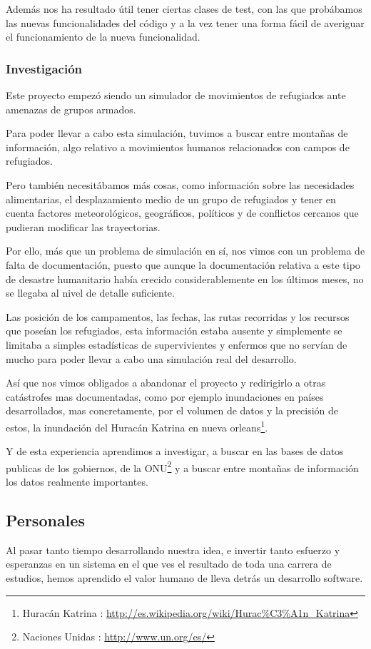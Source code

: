 Además nos ha resultado útil tener ciertas clases de test, con las que
probábamos las nuevas funcionalidades del código y a la vez tener una forma
fácil de averiguar el funcionamiento de la nueva funcionalidad.
\subsubsection*{Investigación}
Este proyecto empezó siendo un simulador de movimientos de refugiados ante
amenazas de grupos armados.

Para poder llevar a cabo esta simulación, tuvimos a buscar entre
montañas de información, algo relativo a movimientos humanos relacionados con
campos de refugiados.

Pero también necesitábamos más cosas, como información sobre las necesidades
alimentarias, el desplazamiento medio de un grupo de refugiados y tener en
cuenta factores meteorológicos, geográficos, políticos y de conflictos cercanos
que pudieran modificar las trayectorias.

Por ello, más que un problema de simulación en sí, nos vimos con un problema de
falta de documentación, puesto que aunque la documentación relativa a este tipo
de desastre humanitario había crecido considerablemente en los últimos meses,
no se llegaba al nivel de detalle  suficiente.

Las posición de los campamentos, las fechas, las rutas recorridas y los recursos
que poseían los refugiados, esta información estaba ausente y simplemente
se limitaba a simples estadísticas de
supervivientes y enfermos que no servían de mucho para poder llevar a cabo una
simulación real del desarrollo.

Así que nos vimos obligados a abandonar el proyecto y redirigirlo a otras
catástrofes mas documentadas, como por ejemplo inundaciones en países
desarrollados, mas concretamente, por el volumen de datos y la precisión de
estos, la inundación del Huracán Katrina en nueva orleans\footnote{Huracán
Katrina : \url{http://es.wikipedia.org/wiki/Hurac\%C3\%A1n_Katrina}}.

Y de esta experiencia aprendimos a investigar, a buscar en las bases de datos
publicas de los gobiernos, de la ONU\footnote{Naciones Unidas :
\url{http://www.un.org/es/}} y a buscar entre montañas de información
los datos realmente importantes.
\subsection*{Personales}
Al pasar tanto tiempo desarrollando nuestra idea, e invertir tanto esfuerzo y
esperanzas en un sistema en el que ves el resultado de toda una carrera de
estudios, hemos aprendido el valor humano de lleva detrás un desarrollo
software.
